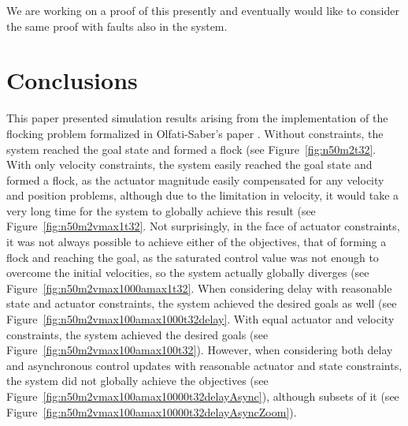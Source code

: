 \documentclass[10pt, conference]{IEEEtran}
\begin{document}
We are working on a proof of this presently and eventually would like to consider the same proof with faults also in the system.

\section{Conclusions}
\label{sec:conclusion}

This paper presented simulation results arising from the implementation of the flocking problem formalized in Olfati-Saber's paper \cite{os2006}.
%
Without constraints, the system reached the goal state and formed a flock (see Figure~\ref{fig:n50m2t32}.
%
With only velocity constraints, the system easily reached the goal state and formed a flock, as the actuator magnitude easily compensated for any velocity and position problems, although due to the limitation in velocity, it would take a very long time for the system to globally achieve this result (see Figure~\ref{fig:n50m2vmax1t32}.
%
Not surprisingly, in the face of actuator constraints, it was not always possible to achieve either of the objectives, that of forming a flock and reaching the goal, as the saturated control value was not enough to overcome the initial velocities, so the system actually globally diverges (see Figure~\ref{fig:n50m2vmax1000amax1t32}.
%
When considering delay with reasonable state and actuator constraints, the system achieved the desired goals as well (see Figure~\ref{fig:n50m2vmax100amax1000t32delay}.
%
With equal actuator and velocity constraints, the system achieved the desired goals (see Figure~\ref{fig:n50m2vmax100amax100t32}).
%
However, when considering both delay and asynchronous control updates with reasonable actuator and state constraints, the system did not globally achieve the objectives (see Figure~\ref{fig:n50m2vmax100amax10000t32delayAsync}), although subsets of it (see Figure~\ref{fig:n50m2vmax100amax10000t32delayAsyncZoom}).



\label{sec:references}


\end{document}
